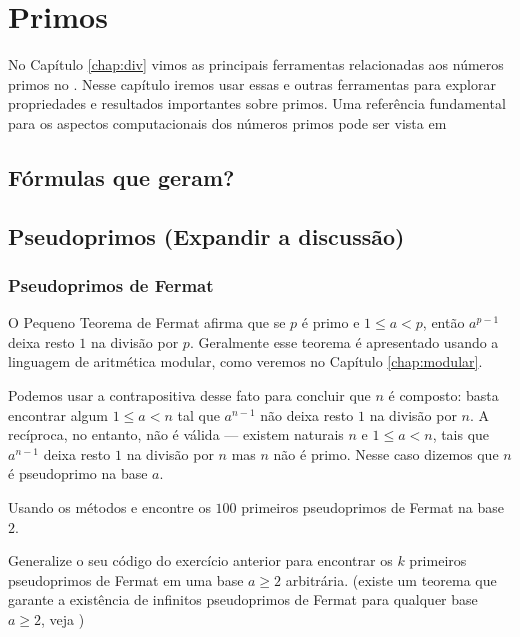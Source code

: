 \chapter{Primos}
\label{chap:primos}

No Capítulo \ref{chap:div} vimos as principais ferramentas 
relacionadas aos números primos no \Sage. Nesse capítulo
iremos usar essas e outras ferramentas para explorar propriedades e
resultados importantes sobre primos. Uma referência fundamental para
os aspectos computacionais dos números primos pode
ser vista em \cite{crandall2006prime}
 


\section{Fórmulas que geram?}

\section{Pseudoprimos (Expandir a discussão)}

\subsection{Pseudoprimos de Fermat}


O Pequeno Teorema de Fermat afirma que se $p$ é primo
e $1\leq a<p$, então $a^{p-1}$ deixa resto $1$ na
divisão por $p$. Geralmente esse teorema é apresentado
usando a linguagem de aritmética modular, como veremos
no Capítulo \ref{chap:modular}. 

Podemos usar a contrapositiva desse fato
para concluir que $n$ é composto: basta encontrar  algum $1\leq a< n$
tal que $a^{n-1}$ não deixa resto $1$ na divisão por $n$. A recíproca,
no entanto, não é válida --- existem naturais
$n$ e $1\leq a < n$, tais que $a^{n-1}$ deixa resto
$1$ na divisão por $n$ mas $n$ não é primo. Nesse caso dizemos que
$n$ é pseudoprimo na
base $a$. 

\begin{exercise}
  Usando os métodos  e 
encontre os $100$ primeiros pseudoprimos de Fermat na base $2$.
\end{exercise}

\begin{exercise}
  Generalize o seu código do exercício anterior para encontrar
  os $k$ primeiros pseudoprimos de Fermat em uma base $a\geq 2$ 
  arbitrária. (existe um teorema que garante a existência de infinitos
  pseudoprimos de Fermat para qualquer base $a \geq 2$, veja
  \cite[Theorem 3.4.4]{crandall2006prime})
\end{exercise}


